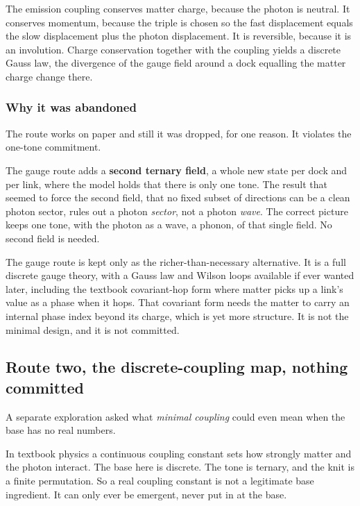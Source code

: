 \begin{lemma}
The emission coupling conserves matter charge, because the photon is neutral. It conserves momentum, because the triple is chosen so the fast displacement equals the slow displacement plus the photon displacement. It is reversible, because it is an involution. Charge conservation together with the coupling yields a discrete Gauss law, the divergence of the gauge field around a dock equalling the matter charge change there.
\end{lemma}

\subsubsection{Why it was abandoned}

The route works on paper and still it was dropped, for one reason. It violates the one-tone commitment.

\begin{result}
The gauge route adds a \textbf{second ternary field}, a whole new state per dock and per link, where the model holds that there is only one tone. The result that seemed to force the second field, that no fixed subset of directions can be a clean photon sector, rules out a photon \emph{sector}, not a photon \emph{wave}. The correct picture keeps one tone, with the photon as a wave, a phonon, of that single field. No second field is needed.
\end{result}

The gauge route is kept only as the richer-than-necessary alternative. It is a full discrete gauge theory, with a Gauss law and Wilson loops available if ever wanted later, including the textbook covariant-hop form where matter picks up a link's value as a phase when it hops. That covariant form needs the matter to carry an internal phase index beyond its charge, which is yet more structure. It is not the minimal design, and it is not committed.

\subsection{Route two, the discrete-coupling map, nothing committed}

A separate exploration asked what \emph{minimal coupling} could even mean when the base has no real numbers.

In textbook physics a continuous coupling constant sets how strongly matter and the photon interact. The base here is discrete. The tone is ternary, and the knit is a finite permutation. So a real coupling constant is not a legitimate base ingredient. It can only ever be emergent, never put in at the base.

